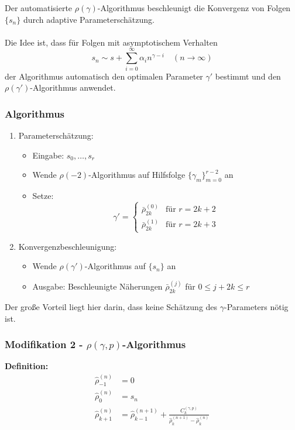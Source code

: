 \documentclass[a4paper,12pt]{article}
\numberwithin{equation}{section}
\theoremstyle{remark}
\begin{document}
Der automatisierte $\rho(\gamma)$-Algorithmus beschleunigt die Konvergenz von Folgen $\{s_n\}$ durch adaptive Parameterschätzung.\\\\
Die Idee ist, dass für Folgen mit asymptotischem Verhalten
\[ s_n \sim s + \sum_{i=0}^\infty \alpha_i n^{\gamma-i} \quad (n\to\infty) \]
der Algorithmus automatisch den optimalen Parameter $\gamma'$ bestimmt und den $\rho(\gamma')$-Algorithmus anwendet.

\subsubsection*{Algorithmus}
\begin{enumerate}
\item {Parameterschätzung}:
\begin{itemize}
\item Eingabe: $s_0,\ldots,s_r$
\item Wende $\rho(-2)$-Algorithmus auf Hilfsfolge $\{\gamma_m\}_{m=0}^{r-2}$ an
\item Setze:
  \[ \gamma' = \begin{cases}
  \bar{\rho}_{2k}^{(0)} & \text{für } r=2k+2 \\
  \bar{\rho}_{2k}^{(1)} & \text{für } r=2k+3
  \end{cases} \]
\end{itemize}

\item {Konvergenzbeschleunigung}:
\begin{itemize}
\item Wende $\rho(\gamma')$-Algorithmus auf $\{s_n\}$ an
\item Ausgabe: Beschleunigte Näherungen $\bar{\rho}_{2k}^{(j)}$ für $0\leq j+2k\leq r$
\end{itemize}
\end{enumerate}
Der große Vorteil liegt hier darin, dass keine Schätzung des $\gamma$-Parameters nötig ist.


\subsubsection{Modifikation 2 - $\rho(\gamma,p)$-Algorithmus}\label{subsubsec:mod2}
\textbf{Definition:}
\begin{align*}
\hat\rho^{(n)}_{-1} &= 0 \quad\\
\hat\rho^{(n)}_0 &= s_n \\
\hat\rho^{(n)}_{k+1} &= \hat\rho^{(n+1)}_{k-1} + \frac{C_k^{(\gamma,p)}}{\hat\rho^{(n+1)}_{k} - \hat\rho^{(n)}_k}
\end{align*}
\end{document}
